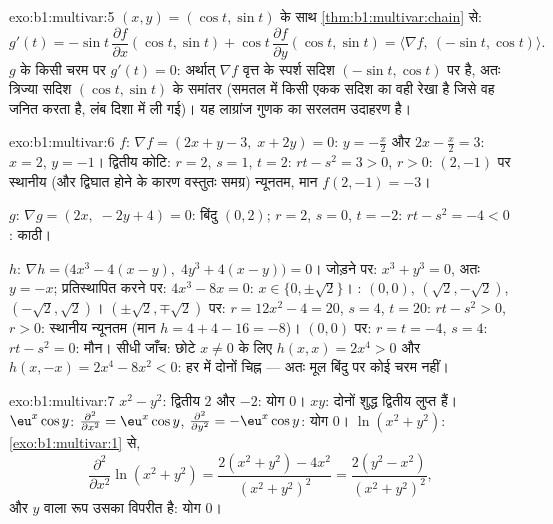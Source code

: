 \begin{solution}{exo:b1:multivar:5}
$(x, y) = (\cos t, \sin t)$ के साथ \cref{thm:b1:multivar:chain} से:
\[
g'(t) = -\sin t\,\frac{\partial f}{\partial x}(\cos t, \sin t)
+ \cos t\,\frac{\partial f}{\partial y}(\cos t, \sin t)
= \bigl\langle \nabla f,\ (-\sin t, \cos t)\bigr\rangle .
\]
$g$ के किसी चरम पर $g'(t) = 0$: अर्थात् $\nabla f$ वृत्त के स्पर्श सदिश
$(-\sin t, \cos t)$ पर  है, अतः त्रिज्या सदिश $(\cos t, \sin t)$ के
समांतर (समतल में किसी एकक सदिश का  वही रेखा है जिसे वह जनित
करता है, लंब दिशा में ली गई)। यह लाग्रांज गुणक का सरलतम उदाहरण है।
\end{solution}

\begin{solution}{exo:b1:multivar:6}
$f$: $\nabla f = (2x + y - 3,\; x + 2y) = 0$: $y = -\frac x2$ और $2x -
\frac x2 = 3$: $x = 2$, $y = -1$। द्वितीय कोटि: $r = 2$, $s = 1$, $t = 2$:
$rt - s^2 = 3 > 0$, $r > 0$: $(2, -1)$ पर स्थानीय (और द्विघात होने के कारण
वस्तुतः समग्र) न्यूनतम, मान $f(2,-1) = -3$।

$g$: $\nabla g = (2x,\; -2y + 4) = 0$: बिंदु $(0, 2)$; $r = 2$, $s = 0$,
$t = -2$: $rt - s^2 = -4 < 0$: काठी।

$h$: $\nabla h = \bigl(4x^3 - 4(x - y),\; 4y^3 + 4(x-y)\bigr) = 0$। जोड़ने
पर: $x^3 + y^3 = 0$, अतः $y = -x$; प्रतिस्थापित करने पर: $4x^3 - 8x = 0$:
$x \in \{0, \pm\sqrt2\}$। : $(0,0)$, $(\sqrt2, -\sqrt2)$,
$(-\sqrt2, \sqrt2)$।
$(\pm\sqrt2, \mp\sqrt2)$ पर: $r = 12x^2 - 4 = 20$, $s = 4$, $t = 20$: $rt
- s^2 > 0$, $r > 0$: स्थानीय न्यूनतम (मान $h = 4 + 4 - 16 = -8$)।
$(0,0)$ पर: $r = t = -4$, $s = 4$: $rt - s^2 = 0$: मौन। सीधी जाँच: छोटे $x
\neq 0$ के लिए $h(x, x) = 2x^4 > 0$ और $h(x, -x) = 2x^4 - 8x^2 < 0$: हर
 में दोनों चिह्न --- अतः मूल बिंदु पर कोई चरम नहीं।
\end{solution}

\begin{solution}{exo:b1:multivar:7}
$x^2 - y^2$: द्वितीय  $2$ और $-2$: योग $0$। $xy$: दोनों शुद्ध
द्वितीय  लुप्त हैं। $\eu^x\cos y$: $\frac{\partial^2}{\partial
x^2} = \eu^x\cos y$, $\frac{\partial^2}{\partial y^2} = -\eu^x\cos y$: योग
$0$। $\ln(x^2+y^2)$: \cref{exo:b1:multivar:1} से,
\[
\frac{\partial^2}{\partial x^2}\ln(x^2+y^2)
= \frac{2(x^2+y^2) - 4x^2}{(x^2+y^2)^2}
= \frac{2(y^2 - x^2)}{(x^2+y^2)^2},
\]
और $y$ वाला रूप उसका विपरीत है: योग $0$।
\end{solution}

